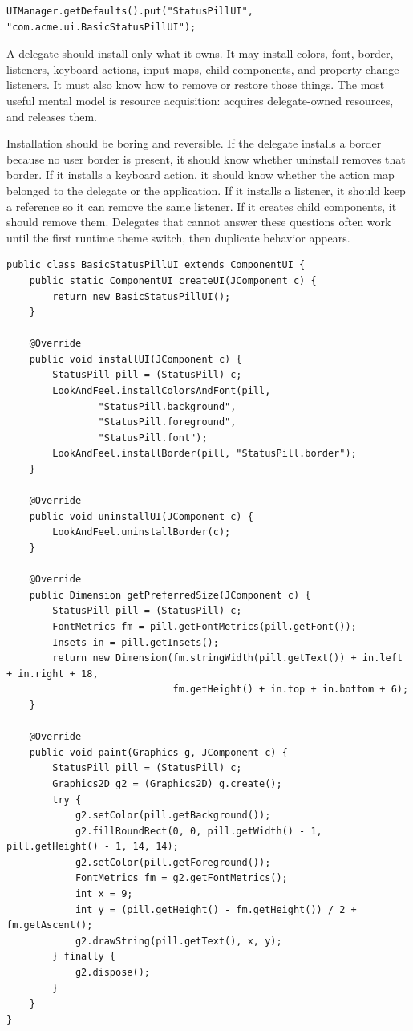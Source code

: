 \begin{lstlisting}
UIManager.getDefaults().put("StatusPillUI", "com.acme.ui.BasicStatusPillUI");
\end{lstlisting}

A delegate should install only what it owns. It may install colors, font, border, listeners, keyboard actions, input maps, child components, and property-change listeners. It must also know how to remove or restore those things. The most useful mental model is resource acquisition:  acquires delegate-owned resources, and  releases them.

Installation should be boring and reversible. If the delegate installs a border because no user border is present, it should know whether uninstall removes that border. If it installs a keyboard action, it should know whether the action map belonged to the delegate or the application. If it installs a listener, it should keep a reference so it can remove the same listener. If it creates child components, it should remove them. Delegates that cannot answer these questions often work until the first runtime theme switch, then duplicate behavior appears.

\begin{lstlisting}[caption={A minimal Basic-style UI delegate.}]
public class BasicStatusPillUI extends ComponentUI {
    public static ComponentUI createUI(JComponent c) {
        return new BasicStatusPillUI();
    }

    @Override
    public void installUI(JComponent c) {
        StatusPill pill = (StatusPill) c;
        LookAndFeel.installColorsAndFont(pill,
                "StatusPill.background",
                "StatusPill.foreground",
                "StatusPill.font");
        LookAndFeel.installBorder(pill, "StatusPill.border");
    }

    @Override
    public void uninstallUI(JComponent c) {
        LookAndFeel.uninstallBorder(c);
    }

    @Override
    public Dimension getPreferredSize(JComponent c) {
        StatusPill pill = (StatusPill) c;
        FontMetrics fm = pill.getFontMetrics(pill.getFont());
        Insets in = pill.getInsets();
        return new Dimension(fm.stringWidth(pill.getText()) + in.left + in.right + 18,
                             fm.getHeight() + in.top + in.bottom + 6);
    }

    @Override
    public void paint(Graphics g, JComponent c) {
        StatusPill pill = (StatusPill) c;
        Graphics2D g2 = (Graphics2D) g.create();
        try {
            g2.setColor(pill.getBackground());
            g2.fillRoundRect(0, 0, pill.getWidth() - 1, pill.getHeight() - 1, 14, 14);
            g2.setColor(pill.getForeground());
            FontMetrics fm = g2.getFontMetrics();
            int x = 9;
            int y = (pill.getHeight() - fm.getHeight()) / 2 + fm.getAscent();
            g2.drawString(pill.getText(), x, y);
        } finally {
            g2.dispose();
        }
    }
}
\end{lstlisting}

